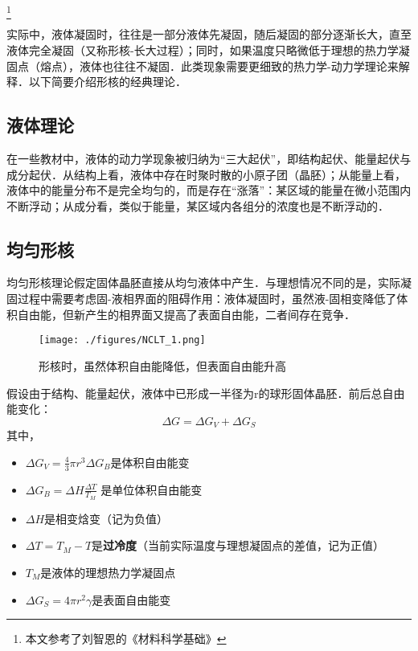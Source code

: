 \footnote{本文参考了刘智恩的《材料科学基础》}

\begin{issues}
\issueDraft
{}
\end{issues}

实际中，液体凝固时，往往是一部分液体先凝固，随后凝固的部分逐渐长大，直至液体完全凝固（又称形核-长大过程）；同时，如果温度只略微低于理想的热力学凝固点（熔点），液体也往往不凝固．此类现象需要更细致的热力学-动力学理论来解释．以下简要介绍形核的经典理论．

\subsection{液体理论}
在一些教材中，液体的动力学现象被归纳为“三大起伏”，即结构起伏、能量起伏与成分起伏．从结构上看，液体中存在时聚时散的小原子团（晶胚）；从能量上看，液体中的能量分布不是完全均匀的，而是存在“涨落”：某区域的能量在微小范围内不断浮动；从成分看，类似于能量，某区域内各组分的浓度也是不断浮动的．

\subsection{均匀形核}
均匀形核理论假定固体晶胚直接从均匀液体中产生．与理想情况不同的是，实际凝固过程中需要考虑固-液相界面的阻碍作用：液体凝固时，虽然液-固相变降低了体积自由能，但新产生的相界面又提高了表面自由能，二者间存在竞争．
\begin{figure}[ht]
\centering
\texttt{[image: ./figures/NCLT\_1.png]}
\caption{形核时，虽然体积自由能降低，但表面自由能升高} \label{NCLT_fig1}
\end{figure}

假设由于结构、能量起伏，液体中已形成一半径为r的球形固体晶胚．前后总自由能变化： 
\begin{equation}\label{NCLT_eq1}
\Delta G  = \Delta G_V +\Delta G_S
\end{equation}
其中，
\begin{itemize}
\item $\Delta G_V = \frac{4}{3}\pi r^3 \Delta G_B$是体积自由能变
\item $\Delta G_B = \Delta H \frac{\Delta T}{T_M}$ 是单位体积自由能变
\item $\Delta H$是相变焓变（记为负值）
\item $\Delta T=T_M-T$是\textbf{过冷度}（当前实际温度与理想凝固点的差值，记为正值）
\item $T_M$是液体的理想热力学凝固点
\item $\Delta G_S = 4\pi r^2 \gamma$是表面自由能变
\end{itemize}

